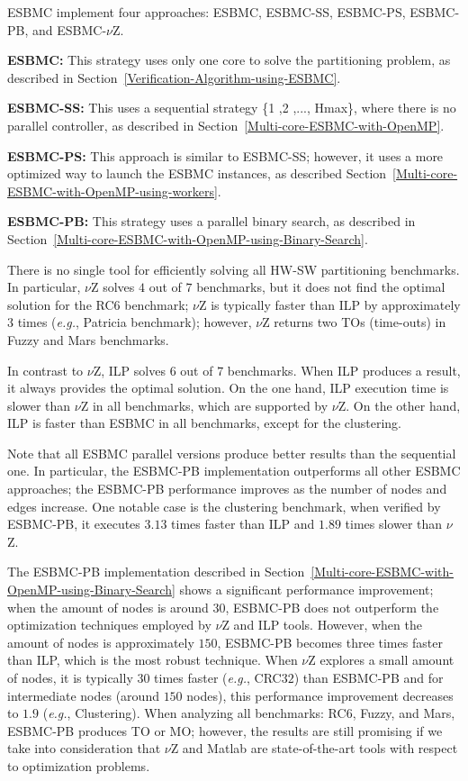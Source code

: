 ESBMC implement four approaches: ESBMC, ESBMC-SS, ESBMC-PS, ESBMC-PB, and ESBMC-$\nu$Z.

\begin{itemize}
\item{\textbf{ESBMC:} This strategy uses only one core to solve the partitioning problem, as described in Section~\ref{Verification-Algorithm-using-ESBMC}.
\item{\textbf{ESBMC-SS:} This uses a sequential strategy \{1 ,2 ,\:...\:, Hmax\}, where there is no parallel controller, as described in Section~\ref{Multi-core-ESBMC-with-OpenMP}.}
\item{\textbf{ESBMC-PS:} This approach is similar to ESBMC-SS; however, it uses a more optimized way to launch the ESBMC instances, as described Section~\ref{Multi-core-ESBMC-with-OpenMP-using-workers}.}
\item{\textbf{ESBMC-PB:} This strategy uses a parallel binary search, as described in Section~\ref{Multi-core-ESBMC-with-OpenMP-using-Binary-Search}.}}
\end{itemize}

There is no single tool for efficiently solving all HW-SW partitioning benchmarks. In particular, $\nu$Z solves $4$ out of $7$ benchmarks, but it does not find the optimal solution for the RC$6$ benchmark; $\nu$Z is typically faster than ILP by approximately $3$ times ({\it e.g.}, Patricia benchmark); however, $\nu$Z returns two TOs (time-outs) in Fuzzy and Mars benchmarks.

In contrast to $\nu$Z, ILP solves $6$ out of $7$ benchmarks. When ILP produces a result, it always provides the optimal solution. On the one hand, ILP execution time is slower than $\nu$Z in all benchmarks, which are supported by $\nu$Z. On the other hand, ILP is faster than ESBMC in all benchmarks, except for the clustering.

Note that all ESBMC parallel versions produce better results than the sequential one. In particular, the ESBMC-PB implementation outperforms all other ESBMC approaches; the ESBMC-PB performance improves as the number of nodes and edges increase. One notable case is the clustering benchmark, when verified by ESBMC-PB, it executes $3$.$13$ times faster than ILP and $1$.$89$ times slower than $\nu$Z.

The ESBMC-PB implementation described in Section~\ref{Multi-core-ESBMC-with-OpenMP-using-Binary-Search} shows a significant performance improvement; when the amount of nodes is around $30$, ESBMC-PB does not outperform the optimization techniques employed by $\nu$Z and ILP tools. However, when the amount of nodes is approximately $150$, ESBMC-PB becomes three times faster than ILP, which is the most robust technique. When $\nu$Z explores a small amount of nodes, it is typically $30$ times faster ({\it e.g.}, CRC$32$) than ESBMC-PB and for intermediate nodes (around $150$ nodes), this performance improvement decreases to $1$.$9$ ({\it e.g.}, Clustering). When analyzing all benchmarks: RC$6$, Fuzzy, and Mars, ESBMC-PB produces TO or MO; however, the results are still promising if we take into consideration that $\nu$Z and Matlab are state-of-the-art tools with respect to optimization problems.

